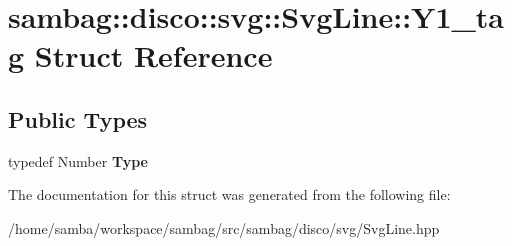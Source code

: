 \hypertarget{structsambag_1_1disco_1_1svg_1_1_svg_line_1_1_y1__tag}{
\section{sambag::disco::svg::SvgLine::Y1\_\-tag Struct Reference}
\label{structsambag_1_1disco_1_1svg_1_1_svg_line_1_1_y1__tag}
}
\subsection*{Public Types}
\begin{DoxyCompactItemize}
\item 
\hypertarget{structsambag_1_1disco_1_1svg_1_1_svg_line_1_1_y1__tag_a5f4e482c1d45adb2388eb8482893aa52}{
typedef Number {\bfseries Type}}
\label{structsambag_1_1disco_1_1svg_1_1_svg_line_1_1_y1__tag_a5f4e482c1d45adb2388eb8482893aa52}

\end{DoxyCompactItemize}


The documentation for this struct was generated from the following file:\begin{DoxyCompactItemize}
\item 
/home/samba/workspace/sambag/src/sambag/disco/svg/SvgLine.hpp\end{DoxyCompactItemize}
